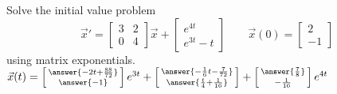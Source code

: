 \documentclass{ximera}
\begin{document}
\begin{exercise}
    Solve the initial value problem
    \[
        {\vec{x}}' = 
        \begin{bmatrix} 
            3 & 2 \\ 
            0 & 4 
        \end{bmatrix}
        \vec{x} + 
        \begin{bmatrix} 
            e^{4t} \\ 
            e^{3t} - t 
        \end{bmatrix} 
        \qquad \vec{x}(0) = 
        \begin{bmatrix} 
            2 \\ 
            -1 
        \end{bmatrix} 
    \] 
    using matrix exponentials.\\
    $\vec{x}(t) = \left[\begin{smallmatrix} \answer{-2t + \frac{88}{72}} \\ \answer{-1} \end{smallmatrix}\right]e^{3t} + \left[\begin{smallmatrix} \answer{-\frac{1}{6}t - \frac{7}{72}} \\ \answer{\frac{t}{4} + \frac{1}{16}} \end{smallmatrix}\right] + \left[\begin{smallmatrix} \answer{\frac{7}{8}} \\-\frac{1}{16} \end{smallmatrix}\right]e^{4t}$
\end{exercise}
\end{document}
